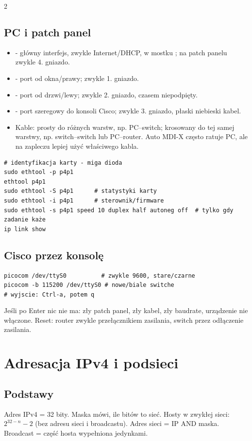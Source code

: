 \documentclass[9pt,a4paper,landscape]{article}
\newcommand{\code}[1]{\texttt{\detokenize{#1}}}
\begin{document}
\begin{multicols*}{2}
\subsection{PC i patch panel}
\begin{itemize}
  \item \code{em1} - główny interfejs, zwykle Internet/DHCP, w mostku \code{br0}; na patch panelu zwykle 4. gniazdo.
  \item \code{p4p1} - port od okna/prawy; zwykle 1. gniazdo.
  \item \code{p4p2} - port od drzwi/lewy; zwykle 2. gniazdo, czasem niepodpięty.
  \item \code{/dev/ttyS0} - port szeregowy do konsoli Cisco; zwykle 3. gniazdo, płaski niebieski kabel.
  \item Kable: prosty do różnych warstw, np. PC--switch; krosowany do tej samej warstwy, np. switch--switch lub PC--router. Auto MDI-X często ratuje PC, ale na zapleczu lepiej użyć właściwego kabla.
\end{itemize}
\begin{lstlisting}
# identyfikacja karty - miga dioda
sudo ethtool -p p4p1
ethtool p4p1
sudo ethtool -S p4p1      # statystyki karty
sudo ethtool -i p4p1      # sterownik/firmware
sudo ethtool -s p4p1 speed 10 duplex half autoneg off  # tylko gdy zadanie każe
ip link show
\end{lstlisting}

\subsection{Cisco przez konsolę}
\begin{lstlisting}
picocom /dev/ttyS0          # zwykle 9600, stare/czarne
picocom -b 115200 /dev/ttyS0 # nowe/biale switche
# wyjscie: Ctrl-a, potem q
\end{lstlisting}
Jeśli po Enter nic nie ma: zły patch panel, zły kabel, zły baudrate, urządzenie nie włączone. Reset: router zwykle przełącznikiem zasilania, switch przez odłączenie zasilania.

\section{Adresacja IPv4 i podsieci}
\subsection{Podstawy}
Adres IPv4 = 32 bity. Maska \code{/n} mówi, ile bitów to sieć. Hosty w zwykłej sieci: \(2^{32-n}-2\) (bez adresu sieci i broadcastu). Adres sieci = IP AND maska. Broadcast = część hosta wypełniona jedynkami.


\end{multicols*}
\end{document}
